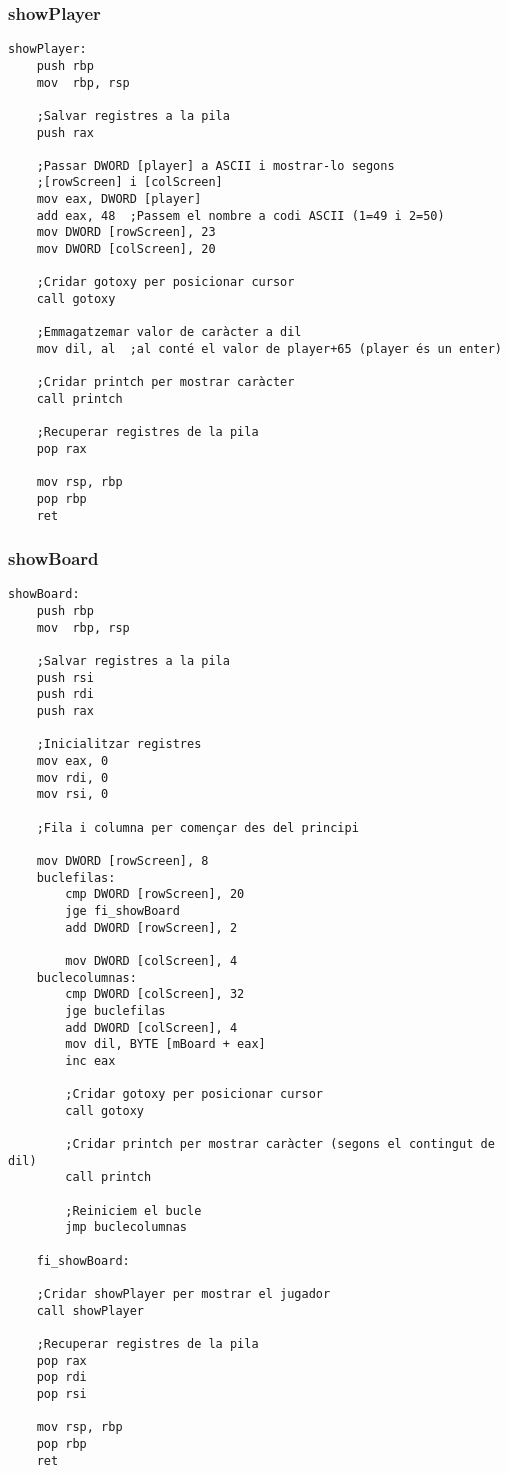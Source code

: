\documentclass[a4paper,12pt]{article}
\begin{document}
\subsubsection{showPlayer}
\begin{lstlisting}[firstnumber=294]
showPlayer:
	push rbp
	mov  rbp, rsp

	;Salvar registres a la pila
	push rax

	;Passar DWORD [player] a ASCII i mostrar-lo segons
	;[rowScreen] i [colScreen]
	mov eax, DWORD [player]
	add eax, 48  ;Passem el nombre a codi ASCII (1=49 i 2=50)
	mov DWORD [rowScreen], 23
	mov DWORD [colScreen], 20

	;Cridar gotoxy per posicionar cursor
	call gotoxy

	;Emmagatzemar valor de caràcter a dil
	mov dil, al  ;al conté el valor de player+65 (player és un enter)

	;Cridar printch per mostrar caràcter
	call printch

	;Recuperar registres de la pila
	pop rax

	mov rsp, rbp
	pop rbp
	ret
\end{lstlisting}
\subsubsection{showBoard}
\begin{lstlisting}[firstnumber=337]
showBoard:
	push rbp
	mov  rbp, rsp

	;Salvar registres a la pila
	push rsi
	push rdi
	push rax
	 
	;Inicialitzar registres
	mov eax, 0
	mov rdi, 0
	mov rsi, 0
	 
	;Fila i columna per començar des del principi
	
	mov DWORD [rowScreen], 8
	buclefilas:
		cmp DWORD [rowScreen], 20
		jge fi_showBoard
		add DWORD [rowScreen], 2

		mov DWORD [colScreen], 4
	buclecolumnas:
		cmp DWORD [colScreen], 32
		jge buclefilas
		add DWORD [colScreen], 4
		mov dil, BYTE [mBoard + eax]
		inc eax

		;Cridar gotoxy per posicionar cursor
		call gotoxy

		;Cridar printch per mostrar caràcter (segons el contingut de dil)
		call printch

		;Reiniciem el bucle
		jmp buclecolumnas
	
	fi_showBoard:

	;Cridar showPlayer per mostrar el jugador
	call showPlayer

	;Recuperar registres de la pila
	pop rax
	pop rdi
	pop rsi

	mov rsp, rbp
	pop rbp
	ret
\end{lstlisting}
\end{document}
